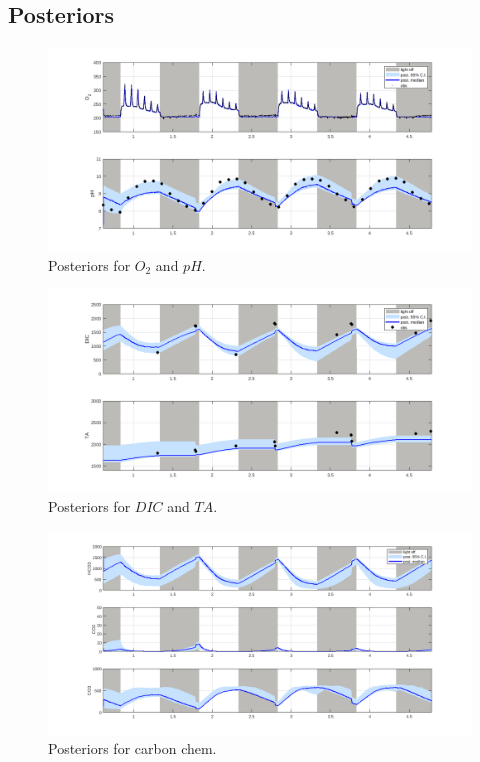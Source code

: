 \documentclass{ruthesis}
\begin{document}
\FloatBarrier
\subsection{Posteriors}



\begin{figure}
	\centerline{\includegraphics[width=1.2\textwidth]{images_microalgae/plots/O2_pH}}
	\caption[.]{Posteriors for $O_2$ and $pH$.}
	\label{fig:pos_O2_pH}
\end{figure}

\begin{figure}
	\centerline{\includegraphics[width=1.2\textwidth]{images_microalgae/plots/DIC_TA}}
	\caption[.]{Posteriors for $DIC$ and $TA$.}
	\label{fig:pos_DIC_TA}
\end{figure}

\begin{figure}
	\centerline{\includegraphics[width=1.2\textwidth]{images_microalgae/plots/carbon}}
	\caption[.]{Posteriors for carbon chem.}
	\label{fig:pos_carbon}
\end{figure}
\end{document}
